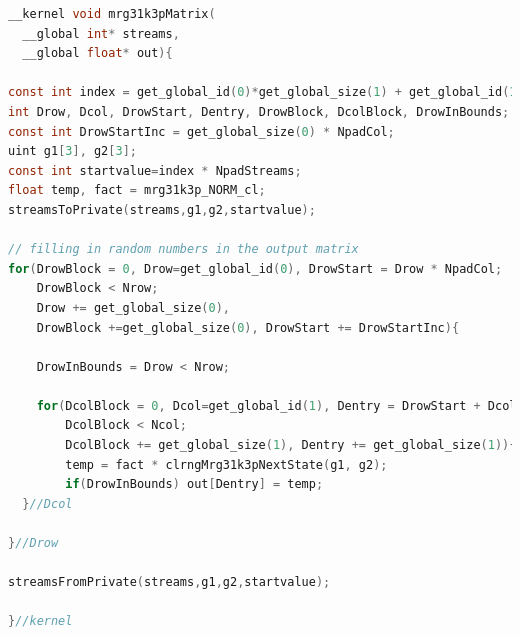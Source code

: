 \documentclass[article,nojss]{jss}\usepackage[]{graphicx}\usepackage[]{color}
\renewcommand{\subfloat}[2][need a sub-caption]{ \subcaptionbox{#1}{#2} }
\begin{document}
\begin{framed}
\begin{lstlisting}[language=C,basicstyle=\small,label={lst:uniformkernel}]
__kernel void mrg31k3pMatrix(
  __global int* streams,
  __global float* out){

const int index = get_global_id(0)*get_global_size(1) + get_global_id(1);
int Drow, Dcol, DrowStart, Dentry, DrowBlock, DcolBlock, DrowInBounds;
const int DrowStartInc = get_global_size(0) * NpadCol;
uint g1[3], g2[3];
const int startvalue=index * NpadStreams;
float temp, fact = mrg31k3p_NORM_cl;
streamsToPrivate(streams,g1,g2,startvalue);

// filling in random numbers in the output matrix
for(DrowBlock = 0, Drow=get_global_id(0), DrowStart = Drow * NpadCol;
    DrowBlock < Nrow;
    Drow += get_global_size(0), 
    DrowBlock +=get_global_size(0), DrowStart += DrowStartInc){
    
    DrowInBounds = Drow < Nrow;
    
    for(DcolBlock = 0, Dcol=get_global_id(1), Dentry = DrowStart + Dcol;
        DcolBlock < Ncol;
        DcolBlock += get_global_size(1), Dentry += get_global_size(1)){
        temp = fact * clrngMrg31k3pNextState(g1, g2);
        if(DrowInBounds) out[Dentry] = temp;
  }//Dcol
  
}//Drow

streamsFromPrivate(streams,g1,g2,startvalue);

}//kernel
\end{lstlisting}
\end{framed}
\end{document}
